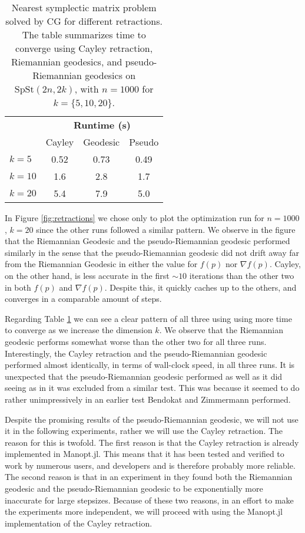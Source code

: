 \begin{table}
    \centering
    \caption[Retraction comparison timetable]{Nearest symplectic matrix problem solved by CG for different retractions. The table summarizes time to converge using Cayley retraction, Riemannian geodesics, and pseudo-Riemannian geodesics on $\mathrm{SpSt}(2n, 2k)$, with $n=1000$ for $k=\{5,10,20\}$. }\label{tab:exp1}
    \begin{tabular}{ l c c c }\label{tbl:Retraction_comparison}
        & \multicolumn{3}{c}{\textbf{Runtime (s)}} \\ 
        \cmidrule(l){2-4}
        & Cayley & Geodesic & Pseudo \\
        \midrule
        $k=5$ & 0.52 & 0.73 & 0.49 \\
        $k=10$ & 1.6 & 2.8 & 1.7 \\
        $k=20$ & 5.4 & 7.9 & 5.0
    \end{tabular}
\end{table}

In Figure \ref{fig:retractions} we chose only to plot the optimization run for $n=1000$, $k=20$ since the other runs followed a similar pattern. We observe in the figure that the Riemannian Geodesic and the pseudo-Riemannian geodesic performed similarly in the sense that the pseudo-Riemannian geodesic did not drift away far from the Riemannian Geodesic in either the value for $f(p)$ nor $\nabla f(p)$. Cayley, on the other hand, is less accurate in the first $\sim10$ iterations than the other two in both  $f(p)$ and $\nabla f(p)$. Despite this, it quickly caches up to the others, and converges in a comparable amount of steps. 

Regarding Table \ref{tbl:Retraction_comparison} we can see a clear pattern of all three using using more time to converge as we increase the dimension $k$. We observe that the Riemannian geodesic performs somewhat worse than the other two for all three runs. Interestingly, the Cayley retraction and the pseudo-Riemannian geodesic performed almost identically, in terms of wall-clock speed, in all three runs. It is unexpected that the pseudo-Riemannian geodesic performed as well as it did seeing as in \cite[p.]{BendokatZimmermann2021} it was excluded from a similar test. This was because it seemed to do rather unimpressively in an earlier test Bendokat and Zimmermann performed. 

Despite the promising results of the pseudo-Riemannian geodesic, we will not use it in the following experiments, rather we will use the Cayley retraction. The reason for this is twofold. The first reason is that the Cayley retraction is already implemented in Manopt.jl. This means that it has been tested and verified to work by numerous users, and developers and is therefore probably more reliable. The second reason is that in an experiment in \cite[p.~26]{BendokatZimmermann2021} they found both the Riemannian geodesic and the pseudo-Riemannian geodesic to be exponentially more inaccurate for large stepsizes. Because of these two reasons, in an effort to make the experiments more independent, we will proceed with using the Manopt.jl implementation of the Cayley retraction.